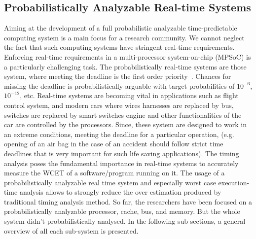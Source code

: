 \subsection{Probabilistically Analyzable Real-time Systems}


Aiming at the development of a full probabilistic analyzable time-predictable computing system is a main focus for a research community. 
We cannot neglect the fact that such computing systems have stringent real-time requirements. Enforcing real-time requirements in a  multi-processor system-on-chip (MPSoC) is a particularly challenging task. The probabilistically real-time systems are those system, where meeting the deadline is the first order priority~\cite{schoeberl2011towards}. Chances for missing the deadline is probabilistically arguable with target probabilities of $10^{-6}$, $10^{-12}$, etc. Real-time systems are becoming vital in applications such as flight control system, and modern cars where wires harnesses are replaced by bus, switches are replaced by smart switches engine and other functionalities of the car are controlled by the processors. Since, these system are designed to work in an extreme conditions, meeting the deadline for a particular operation, (e.g. opening of an air bag in the case of an accident should follow strict time deadlines that is very important for such life saving applications). The timing analysis poses the fundamental importance in real-time systems to accurately measure the WCET of a software/program running on it. The usage of a probabilistically analyzable real time system and especially worst case execution-time analysis allows to strongly reduce the over estimation produced by traditional timing analysis method. So far, the researchers have been focused on a probabilistically analyzable processor, cache, bus, and memory. But the whole system didn't probabilistically analysed. In the following sub-sections, a general overview of all each sub-system is presented. 




%
%
